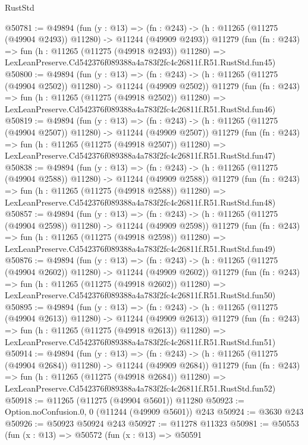 \begin{lexlean}{RustStd}
\begin{coremodule}
@50781 := @49894
    (fun (y : @13) =>
    (fn : @243) -> (h : @11265 (@11275 (@49904 @2493)) @11280) -> @11244 (@49909 @2493))
    @11279
    (fun (fn : @243) =>
    fun (h : @11265 (@11275 (@49918 @2493)) @11280) =>
    LexLeanPreserve.Cd542376f089388a4a783f2fc4c26811f.R51.RustStd.fun45)
@50800 := @49894
    (fun (y : @13) =>
    (fn : @243) -> (h : @11265 (@11275 (@49904 @2502)) @11280) -> @11244 (@49909 @2502))
    @11279
    (fun (fn : @243) =>
    fun (h : @11265 (@11275 (@49918 @2502)) @11280) =>
    LexLeanPreserve.Cd542376f089388a4a783f2fc4c26811f.R51.RustStd.fun46)
@50819 := @49894
    (fun (y : @13) =>
    (fn : @243) -> (h : @11265 (@11275 (@49904 @2507)) @11280) -> @11244 (@49909 @2507))
    @11279
    (fun (fn : @243) =>
    fun (h : @11265 (@11275 (@49918 @2507)) @11280) =>
    LexLeanPreserve.Cd542376f089388a4a783f2fc4c26811f.R51.RustStd.fun47)
@50838 := @49894
    (fun (y : @13) =>
    (fn : @243) -> (h : @11265 (@11275 (@49904 @2588)) @11280) -> @11244 (@49909 @2588))
    @11279
    (fun (fn : @243) =>
    fun (h : @11265 (@11275 (@49918 @2588)) @11280) =>
    LexLeanPreserve.Cd542376f089388a4a783f2fc4c26811f.R51.RustStd.fun48)
@50857 := @49894
    (fun (y : @13) =>
    (fn : @243) -> (h : @11265 (@11275 (@49904 @2598)) @11280) -> @11244 (@49909 @2598))
    @11279
    (fun (fn : @243) =>
    fun (h : @11265 (@11275 (@49918 @2598)) @11280) =>
    LexLeanPreserve.Cd542376f089388a4a783f2fc4c26811f.R51.RustStd.fun49)
@50876 := @49894
    (fun (y : @13) =>
    (fn : @243) -> (h : @11265 (@11275 (@49904 @2602)) @11280) -> @11244 (@49909 @2602))
    @11279
    (fun (fn : @243) =>
    fun (h : @11265 (@11275 (@49918 @2602)) @11280) =>
    LexLeanPreserve.Cd542376f089388a4a783f2fc4c26811f.R51.RustStd.fun50)
@50895 := @49894
    (fun (y : @13) =>
    (fn : @243) -> (h : @11265 (@11275 (@49904 @2613)) @11280) -> @11244 (@49909 @2613))
    @11279
    (fun (fn : @243) =>
    fun (h : @11265 (@11275 (@49918 @2613)) @11280) =>
    LexLeanPreserve.Cd542376f089388a4a783f2fc4c26811f.R51.RustStd.fun51)
@50914 := @49894
    (fun (y : @13) =>
    (fn : @243) -> (h : @11265 (@11275 (@49904 @2684)) @11280) -> @11244 (@49909 @2684))
    @11279
    (fun (fn : @243) =>
    fun (h : @11265 (@11275 (@49918 @2684)) @11280) =>
    LexLeanPreserve.Cd542376f089388a4a783f2fc4c26811f.R51.RustStd.fun52)
@50918 := @11265 (@11275 (@49904 @5601)) @11280
@50923 := Option.noConfusion.{0, 0} (@11244 (@49909 @5601)) @243
@50924 := @3630 @243
@50926 := @50923 @50924 @243
@50927 := @11278 @11323
@50981 := @50553
    (fun (x : @13) =>
    @50572
      (fun (x : @13) =>
      @50591

\end{coremodule}
\end{lexlean}
